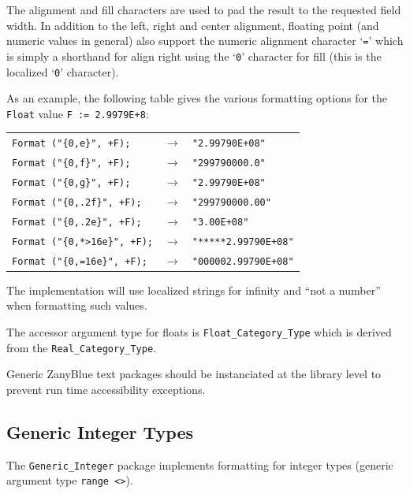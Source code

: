 The alignment and fill characters are used to pad the result to the requested
field width.  In addition to the left, right and center alignment, floating
point (and numeric values in general) also support the numeric alignment
character `\texttt{=}' which is simply a shorthand for align right using the
`\texttt{0}' character for fill (this is the localized `\texttt{0}' character).

As an example, the following table gives the various formatting options
for the \texttt{Float} value \verb|F := 2.9979E+8|:
\begin{center}
\begin{tabular}{lll}
\verb|Format ("{0,e}", +F);| & $\rightarrow$ & \verb|"2.99790E+08"|\\
\verb|Format ("{0,f}", +F);| & $\rightarrow$ & \verb|"299790000.0"|\\
\verb|Format ("{0,g}", +F);| & $\rightarrow$ & \verb|"2.99790E+08"|\\
\verb|Format ("{0,.2f}", +F);| & $\rightarrow$ & \verb|"299790000.00"|\\
\verb|Format ("{0,.2e}", +F);| & $\rightarrow$ & \verb|"3.00E+08"|\\
\verb|Format ("{0,*>16e}", +F);| & $\rightarrow$ & \verb|"*****2.99790E+08"|\\
\verb|Format ("{0,=16e}", +F);| & $\rightarrow$ & \verb|"000002.99790E+08"|
\end{tabular}
\end{center}

The implementation will use localized strings for infinity and ``not a number''
when formatting such values.

The accessor argument type for floats is \texttt{Float\_Category\_Type}
which is derived from the \texttt{Real\_Category\_Type}.

Generic ZanyBlue text packages should be instanciated at the library
level to prevent run time accessibility exceptions.

\subsection{Generic Integer Types}
\label{sec:generic_integer}

The \verb|Generic_Integer| package implements formatting for
integer types (generic argument type \verb|range <>|).

